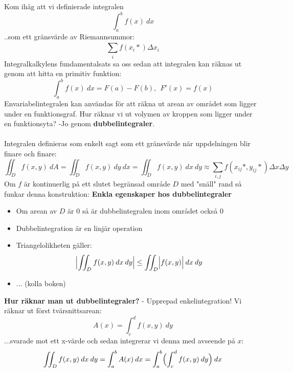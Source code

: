 \documentclass{report}
\begin{document}
\noindent
Kom ihåg att vi definierade integralen
\begin{equation*}
\int_{a}^{b} f(x) \: dx
\end{equation*}
..som ett gränsvärde av Riemannsummor:
\begin{equation*}
\sum_{i}^{} f(x_i*) \Delta x_i
\end{equation*}
Integralkalkylens fundamentalsats sa oss sedan att integralen kan räknas ut genom att hitta en primitiv funktion:
\begin{equation*}
\int_{a}^{b} f(x) \: dx = F(a) - F(b), \:\: F'(x) = f(x) 
\end{equation*}
Envariabelintegralen kan användas för att räkna ut arean av området som ligger under en funktionsgraf. Hur räknar vi ut volymen av kroppen som ligger under en funktionsyta? -Jo genom \textbf{dubbelintegraler}.\\\\

\noindent
Integralen definieras som enkelt sagt som ett gränsvärde när uppdelningen blir finare och finare:
\begin{equation*}
	\iint_{D}^{} f(x,y) \: dA = \iint_{D}^{} f(x,y) \: dy  \: dx = \iint_{D}^{} f(x,y) \: dx  \: dy \approx \sum_{i,j}^{} f(x_{ij}*, y_{ij}*)\Delta x \Delta y   
\end{equation*}
Om $ f $ är kontinuerlig på ett slutet begränsad område $ D $ med "snäll" rand så funkar denna konstruktion:
\textbf{Enkla egenskaper hos dubbelintegraler}
\begin{itemize}
	\item Om arean av $ D $ är 0 så är dubbelintegralen inom området också 0
	\item Dubbelintegration är en linjär operation
	\item Triangelolikheten gäller:
	\begin{equation*}
	\Bigl| \iint_D{}^{} f(x,y) \: dx   \: dy  \Bigr| \le \iint_{D}^{} \Bigl|f(x,y)\Bigr| \: dx   \: dy 
	\end{equation*}
\item ... (kolla boken)	
\end{itemize}
\textbf{Hur räknar man ut dubbelintegraler?} - Upprepad enkelintegration!
Vi räknar ut först tvärsnittsarean:
\begin{equation*}
A(x) = \int_{c}^{d} f(x,y) \: dy 
\end{equation*}
...svarade mot ett x-värde och sedan integrerar vi denna med avseende på $ x $:
\begin{equation*}
\iint_{D}^{} f(x,y) \: dx   \: dy = \int_{a}^{b} A(x) \: dx = \int_{a}^{b} \Bigl( \int_{c}^{d} f(x,y) \: dy  \Bigr) \: dx   
\end{equation*}
\end{document}

